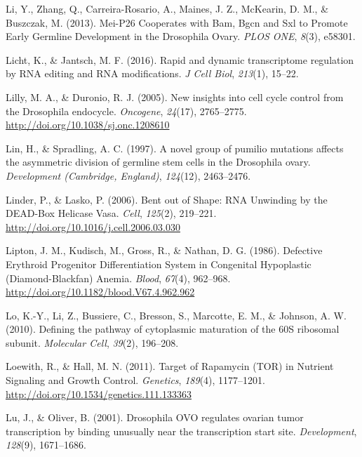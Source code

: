\documentclass[12pt,twoside]{reedthesis}
\newlength{\cslhangindent}
\newenvironment{cslreferences}%
  {\setlength{\parindent}{0pt}%
  \everypar{\setlength{\hangindent}{\cslhangindent}}\ignorespaces}%
  {\par}
\begin{document}
\begin{cslreferences}
\leavevmode\hypertarget{ref-Li2013h}{}%
Li, Y., Zhang, Q., Carreira-Rosario, A., Maines, J. Z., McKearin, D. M., \& Buszczak, M. (2013). Mei-P26 Cooperates with Bam, Bgcn and Sxl to Promote Early Germline Development in the Drosophila Ovary. \emph{PLOS ONE}, \emph{8}(3), e58301.

\leavevmode\hypertarget{ref-Licht2016}{}%
Licht, K., \& Jantsch, M. F. (2016). Rapid and dynamic transcriptome regulation by RNA editing and RNA modifications. \emph{J Cell Biol}, \emph{213}(1), 15--22.

\leavevmode\hypertarget{ref-Lilly2005d}{}%
Lilly, M. A., \& Duronio, R. J. (2005). New insights into cell cycle control from the Drosophila endocycle. \emph{Oncogene}, \emph{24}(17), 2765--2775. \url{http://doi.org/10.1038/sj.onc.1208610}

\leavevmode\hypertarget{ref-Lin1997b}{}%
Lin, H., \& Spradling, A. C. (1997). A novel group of pumilio mutations affects the asymmetric division of germline stem cells in the Drosophila ovary. \emph{Development (Cambridge, England)}, \emph{124}(12), 2463--2476.

\leavevmode\hypertarget{ref-Linder2006}{}%
Linder, P., \& Lasko, P. (2006). Bent out of Shape: RNA Unwinding by the DEAD-Box Helicase Vasa. \emph{Cell}, \emph{125}(2), 219--221. \url{http://doi.org/10.1016/j.cell.2006.03.030}

\leavevmode\hypertarget{ref-liptonDefectiveErythroidProgenitor1986}{}%
Lipton, J. M., Kudisch, M., Gross, R., \& Nathan, D. G. (1986). Defective Erythroid Progenitor Differentiation System in Congenital Hypoplastic (Diamond-Blackfan) Anemia. \emph{Blood}, \emph{67}(4), 962--968. \url{http://doi.org/10.1182/blood.V67.4.962.962}

\leavevmode\hypertarget{ref-Lo2010a}{}%
Lo, K.-Y., Li, Z., Bussiere, C., Bresson, S., Marcotte, E. M., \& Johnson, A. W. (2010). Defining the pathway of cytoplasmic maturation of the 60S ribosomal subunit. \emph{Molecular Cell}, \emph{39}(2), 196--208.

\leavevmode\hypertarget{ref-loewithTargetRapamycinTOR2011}{}%
Loewith, R., \& Hall, M. N. (2011). Target of Rapamycin (TOR) in Nutrient Signaling and Growth Control. \emph{Genetics}, \emph{189}(4), 1177--1201. \url{http://doi.org/10.1534/genetics.111.133363}

\leavevmode\hypertarget{ref-Lu2001}{}%
Lu, J., \& Oliver, B. (2001). Drosophila OVO regulates ovarian tumor transcription by binding unusually near the transcription start site. \emph{Development}, \emph{128}(9), 1671--1686.


\end{cslreferences}
\end{document}
